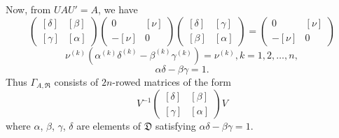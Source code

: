 Now, from $UAU'=A$, we have
$$
\begin{pmatrix}
[\delta] & [\beta]\\
[\gamma] & [\alpha]
\end{pmatrix}
\begin{pmatrix}
0 & [\nu]\\
-[\nu] & 0
\end{pmatrix}
\begin{pmatrix}
[\delta] & [\gamma]\\
[\beta] & [\alpha]
\end{pmatrix}
=
\begin{pmatrix}
0 & [\nu]\\
-[\nu] & 0
\end{pmatrix}
$$
\ie\pageoriginale
$$
\nu^{(k)}(\alpha^{(k)}\delta^{(k)}-\beta^{(k)}\gamma^{(k)})=\nu^{(k)},k=1,2,\ldots,n, 
$$
\ie
$$
\alpha\delta-\beta\gamma=1.
$$
Thus $\Gamma_{A,\mathfrak{R}}$ consists of $2n$-rowed matrices of the
form
$$
V^{-1}
\begin{pmatrix}
[\delta] & [\beta]\\
[\gamma] & [\alpha]
\end{pmatrix}
V
$$
where $\alpha$, $\beta$, $\gamma$, $\delta$ are elements of
$\mathfrak{D}$ satisfying $\alpha\delta-\beta\gamma=1$.

